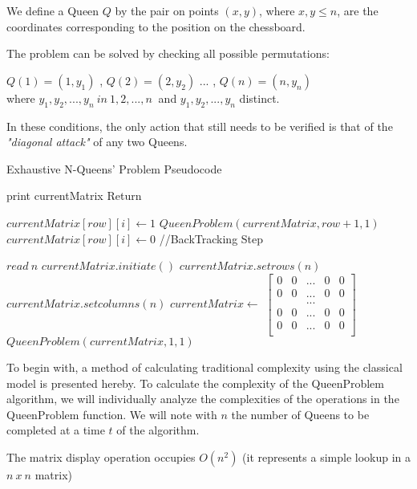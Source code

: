 We define a Queen $Q$ by the pair on points $ (x, y) $, where $ x, y \leq n $, are the coordinates corresponding to the position on the chessboard.

The problem can be solved by checking all possible permutations: 

$ Q (1) = (1, y_1) $ , $ Q (2) = (2, y_2) $ ... , $ Q (n) = (n, y_n) $ \\
where $ y_1, y_2, ..., y_n \ in \ { 1,2, ..., n \ } $ and $ y_1, y_2, ..., y_n $ distinct. 

In these conditions, the only action that still needs to be verified is that of the \textit{"diagonal attack"} of any two Queens.

\begin{algorithm}[H]
\caption{Exhaustive N-Queens’ Problem Pseudocode}
\begin{algorithmic}[1]
	\State print currentMatrix
	\State Return

\EndIf
{}
		\State $currentMatrix[row][i] \gets 1$
		\State $QueenProblem(currentMatrix,row+1,1)$
		\State $currentMatrix[row][i] \gets 0$
		//BackTracking Step
	\EndIf
\EndFor
\EndProcedure
{}


\State $read\ n$
\State $currentMatrix.initiate()$
\State $currentMatrix.setrows(n)$
\State $currentMatrix.setcolumns(n)$
\State $currentMatrix \gets$
$\left[\begin{array}{ccccc}
0 & 0 & ... & 0 & 0	\\
0 & 0 & ... & 0 & 0	\\
 &  & ... &  & 	\\
0 & 0 & ... & 0 & 0	\\
0 & 0 & ... & 0 & 0	\\
\end{array}\right]$ 
\State $QueenProblem(currentMatrix,1,1)$
\EndProcedure
\end{algorithmic}
\end{algorithm}

To begin with, a method of calculating traditional complexity using the classical model is presented hereby.
To calculate the complexity of the QueenProblem algorithm, we will individually analyze the complexities of the operations in the QueenProblem function. We will note with $n$ the number of Queens to be completed at a time $ t $ of the algorithm.

The matrix display operation occupies $ O (n ^ 2) $ (it represents a simple lookup in a $n\ x\ n$ matrix)

